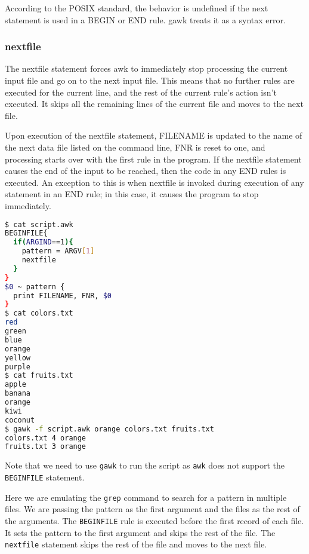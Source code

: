 \begin{remark}
According to the POSIX standard, the behavior is undefined if the next statement is used in a BEGIN or END rule. gawk treats it as a syntax error.
\end{remark}

\subsubsection{nextfile}

\begin{definition}[nextfile]
  The nextfile statement forces awk to immediately stop processing the current input file and go on to the next input file.
  This means that no further rules are executed for the current line, and the rest of the current rule's action isn't executed.
  It skips all the remaining lines of the current file and moves to the next file.
\end{definition}

Upon execution of the nextfile statement, FILENAME is updated to the name of the next data file listed on the command line,
FNR is reset to one, and processing starts over with the first rule in the program.
If the nextfile statement causes the end of the input to be reached, then the code in any END rules is executed.
An exception to this is when nextfile is invoked during execution of any statement in an END rule;
in this case, it causes the program to stop immediately. 

\begin{lstlisting}[language=bash]
$ cat script.awk
BEGINFILE{
  if(ARGIND==1){
    pattern = ARGV[1]
    nextfile
  }
}
$0 ~ pattern {
  print FILENAME, FNR, $0
}
$ cat colors.txt
red
green
blue
orange
yellow
purple
$ cat fruits.txt
apple
banana
orange
kiwi
coconut
$ gawk -f script.awk orange colors.txt fruits.txt
colors.txt 4 orange
fruits.txt 3 orange
\end{lstlisting}

Note that we need to use \lstinline|gawk| to run the script as \lstinline|awk| does not support the \lstinline|BEGINFILE| statement.

Here we are emulating the \lstinline|grep| command to search for a pattern in multiple files.
We are passing the pattern as the first argument and the files as the rest of the arguments.
The \lstinline|BEGINFILE| rule is executed before the first record of each file.
It sets the pattern to the first argument and skips the rest of the file.
The \lstinline|nextfile| statement skips the rest of the file and moves to the next file.

